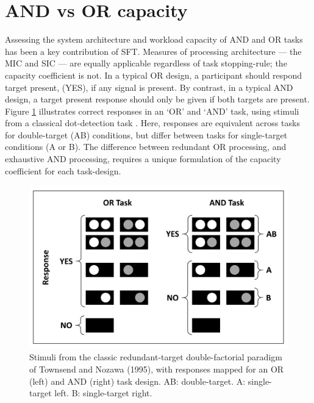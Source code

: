 \section{AND vs OR capacity}
Assessing the system architecture and workload capacity of AND and OR tasks has been a key contribution of SFT. Measures of processing architecture --- the MIC and SIC --- are equally applicable regardless of task stopping-rule; the capacity coefficient is not. In a typical OR design, a participant should respond target present, (\ie YES), if any signal is present. By contrast, in a typical AND design, a target present response should only be given if both targets are present. Figure \ref{fig:Ch5_AndvsOR} illustrates correct responses in an `OR' and `AND' task, using stimuli from a classical dot-detection task \cite{Townsend_1995}. Here, responses are equivalent across tasks for double-target (AB) conditions, but differ between tasks for single-target conditions (A or B). The difference between redundant OR processing, and exhaustive AND processing, requires a unique formulation of the capacity coefficient for each task-design. 

\begin{figure}[htb]
\centering
\includegraphics[scale=.6]{Figures/Mix/AndvsOR.jpg}
\caption{Stimuli from the classic redundant-target double-factorial paradigm of Townsend and Nozawa (1995), with responses mapped for an OR (left) and AND (right) task design. AB: double-target. A: single-target left. B: single-target right.}
\label{fig:Ch5_AndvsOR}
\end{figure}

